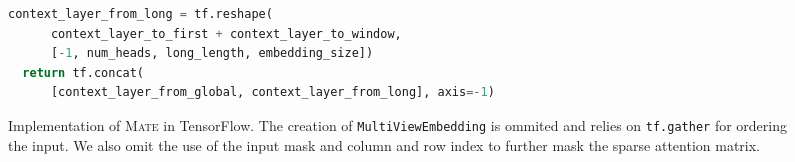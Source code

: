 \documentclass[11pt]{article}
\newcommand{\model}{\textsc{Mate}\xspace}
\begin{document}
\begin{figure*}
\begin{center}
{\begin{lstlisting}[language=Python]
  context_layer_from_long = tf.reshape(
      context_layer_to_first + context_layer_to_window, 
      [-1, num_heads, long_length, embedding_size])
  return tf.concat(
      [context_layer_from_global, context_layer_from_long], axis=-1)

\end{lstlisting}
}
\caption{Implementation of \model in TensorFlow. The creation of \texttt{MultiViewEmbedding} is ommited and relies on \texttt{tf.gather} for ordering the input. We also omit the use of the input mask and column and row index to further mask the sparse attention matrix.}
\label{code}
\end{center}
\end{figure*} 
\end{document}
